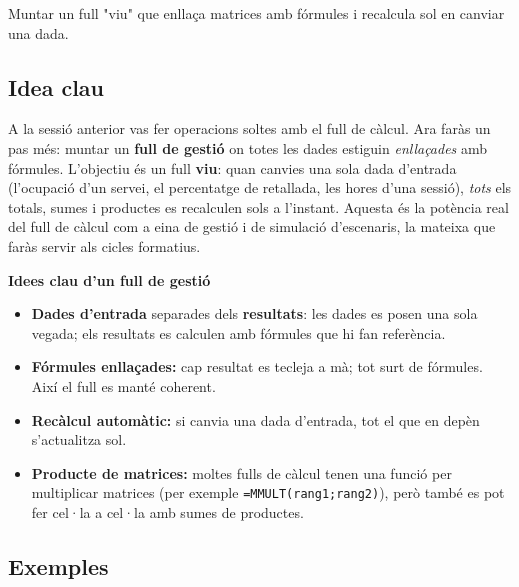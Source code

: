 %
{Muntar un full "viu" que enllaça matrices amb fórmules i recalcula sol en canviar una dada.}

\subsection{Idea clau}

A la sessió anterior vas fer operacions soltes amb el full de càlcul. Ara faràs un
pas més: muntar un \textbf{full de gestió} on totes les dades estiguin
\emph{enllaçades} amb fórmules. L'objectiu és un full \textbf{viu}: quan canvies
una sola dada d'entrada (l'ocupació d'un servei, el percentatge de retallada, les
hores d'una sessió), \emph{tots} els totals, sumes i productes es recalculen sols
a l'instant. Aquesta és la potència real del full de càlcul com a eina de gestió i
de simulació d'escenaris, la mateixa que faràs servir als cicles formatius.

\begin{idea}
\textbf{Idees clau d'un full de gestió}
\begin{itemize}[leftmargin=1.4em, itemsep=2pt]
  \item \textbf{Dades d'entrada} separades dels \textbf{resultats}: les dades es
        posen una sola vegada; els resultats es calculen amb fórmules que hi fan
        referència.
  \item \textbf{Fórmules enllaçades:} cap resultat es tecleja a mà; tot surt de
        fórmules. Així el full es manté coherent.
  \item \textbf{Recàlcul automàtic:} si canvia una dada d'entrada, tot el que en
        depèn s'actualitza sol.
  \item \textbf{Producte de matrices:} moltes fulls de càlcul tenen una funció per
        multiplicar matrices (per exemple \texttt{=MMULT(rang1;rang2)}), però
        també es pot fer cel·la a cel·la amb sumes de productes.
\end{itemize}
\end{idea}

\subsection{Exemples}


